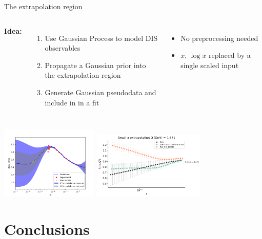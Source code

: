 \documentclass[aspectratio=169,10pt]{beamer}
\begin{document}
\begin{frame}{ The extrapolation region}
\begin{columns}
    \textbf{Idea:}
    \begin{enumerate}
        \item Use Gaussian Process to model DIS observables
        \item Propagate a Gaussian prior into the {extrapolation region}
        \item Generate {Gaussian pseudodata} and include in in a fit
    \end{enumerate}
    \begin{itemize}
         \item No preprocessing needed
         \item $x$, $\log x$ replaced by a single scaled input
    \end{itemize}
\end{columns}
        \begin{center}
            \includegraphics[width=0.35\textwidth]{feature_scaling/GP} \hspace*{1em}
            \includegraphics[width=0.4\textwidth]{feature_scaling/psuedodata_fit}
        \end{center}
\end{frame}


\section*{Conclusions}
\end{document}
